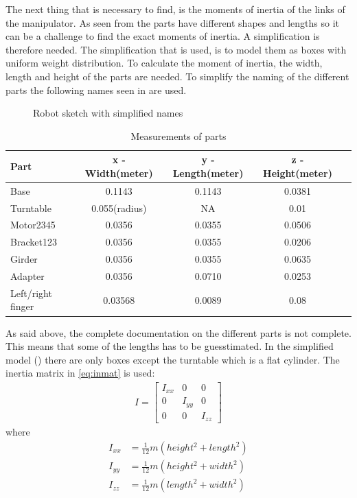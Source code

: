 The next thing that is necessary to find, is the moments of inertia of the links of the manipulator. As seen from  the parts have different shapes and lengths so it can be a challenge to find the exact moments of inertia. A simplification is therefore needed. The simplification that is used, is to model them as boxes with uniform weight distribution. To calculate the moment of inertia, the width, length and height of the parts are needed. To simplify the naming of the different parts the following names seen in  are used.
\begin{figure}[htbp]
  \centering
  
  \caption{Robot sketch with simplified names}
  \label{fig:naming}
\end{figure}
\begin{table}[htbp]
\centering
\caption{Measurements of parts}
\label{table:measurements}
    \begin{tabular}{l c c c r}
        \toprule
        Part  &  x - Width(meter) & y - Length(meter) & z - Height(meter)\\
        \midrule
        Base & 0.1143 & 0.1143 & 0.0381\\
        Turntable & 0.055(radius) & NA & 0.01\\
        Motor2345 & 0.0356 & 0.0355 & 0.0506 \\
        Bracket123 & 0.0356 & 0.0355 & 0.0206 \\
        Girder & 0.0356 & 0.0355 & 0.0635\\
        Adapter & 0.0356 & 0.0710 & 0.0253\\
        Left/right finger & 0.03568 & 0.0089 & 0.08\\
        \bottomrule
    \end{tabular}
\end{table}

As said above, the complete documentation on the different parts is not complete. This means that some of the lengths has to be guesstimated\cite{Crustcrawler}. In the simplified model () there are only boxes except the turntable which is a flat cylinder. The inertia matrix in \eqref{eq:inmat} is used:
\begin{align}\label{eq:inmat}
    I = 
    \begin{bmatrix}
        I_{xx} & 0 & 0\\
        0 & I_{yy} & 0\\
        0 & 0 & I_{zz}
    \end{bmatrix}
\end{align}
where
\begin{align*}
    I_{xx} &= \frac{1}{12}m(height^2+length^2)\\
    I_{yy} &= \frac{1}{12}m(height^2+width^2)\\
    I_{zz} &= \frac{1}{12}m(length^2+width^2)
\end{align*}

